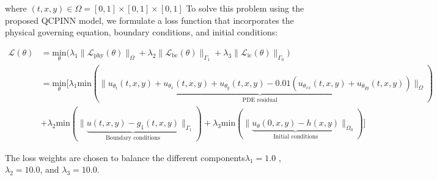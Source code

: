 \noindent where $(t, x, y) \in \Omega = [0,1] \times [0,1] \times [0,1] $
To solve this problem using the proposed QCPINN model, we formulate a loss function that incorporates the physical governing equation, boundary conditions, and initial conditions:

\begin{equation}
\begin{split}
\mathcal{L}(\theta) &= \underset{\theta}{\text{min}} \big( \lambda_1 \|\mathcal{L}_{\text{phy}}(\theta)\|_{\Omega} + \lambda_2 \|\mathcal{L}_{\text{bc}}(\theta)\|_{\Gamma_1} + \lambda_3 \|\mathcal{L}_{\text{ic}}(\theta)\|_{\Gamma_0} \big) \\
&= \underset{\theta}{\text{min}} \big[ \lambda_1 \text{min}(\|\underbrace{u_{\theta_{t}}(t, x, y) + u_{\theta_{x}}(t, x, y) + u_{\theta_{y}}(t, x, y) - 0.01(u_{\theta_{xx}}(t, x, y) + u_{\theta_{yy}}(t, x, y))}_{\text{PDE residual}}\|_{\Omega}) \\
&+ \lambda_2 \text{min}(\|\underbrace{u(t, x, y) - g_1(t, x, y)}_{\text{Boundary conditions}}\|_{\Gamma_1}) + \lambda_3 \text{min}(\|\underbrace{u_{\theta}(0, x, y) - h(x, y)}_{\text{Initial conditions}}\|_{\Omega_0}) \big]
\end{split}
\label{eq:Convection-Diffusion_loss}
\end{equation}

\noindent  The loss weights are chosen to balance the different components$\lambda_1 = 1.0$ , $\lambda_2 = 10.0$, and $\lambda_3 = 10.0$.

